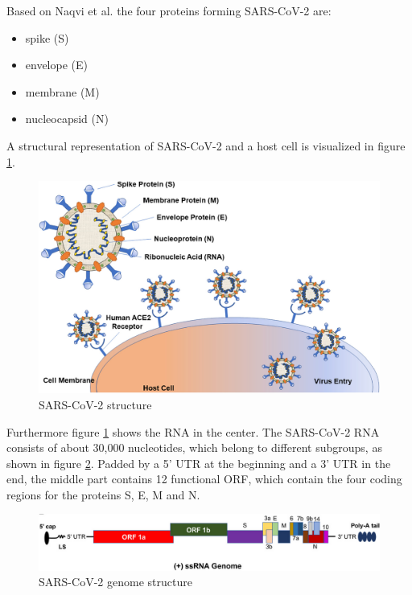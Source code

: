 Based on Naqvi et al. \cite{NAQVI2020165878} the four proteins forming \ac{SARS-CoV-2} are:
\begin{itemize}
	\item spike (S)
	\item envelope (E)
	\item membrane (M)
	\item nucleocapsid (N)
\end{itemize}

A structural representation of \ac{SARS-CoV-2} and a host cell is visualized in figure \ref{sarscov2_structure}. \cite{NAQVI2020165878}

\begin{figure}[ht]
	\centering
	\includegraphics[width=0.8\linewidth]{figures/SARS-CoV-2Structure.jpg}
	\caption{SARS-CoV-2 structure \cite{NAQVI2020165878}}
	\label{sarscov2_structure}
\end{figure}

Furthermore figure \ref{sarscov2_structure} shows the \ac{RNA} in the center. The \ac{SARS-CoV-2} \ac{RNA} consists of about 30,000 nucleotides, which belong to different subgroups, as shown in figure \ref{sarscov2GenomeStructure}. 
Padded by a 5' \ac{UTR} at the beginning and a 3' \ac{UTR} in the end, the middle part contains 12 functional \ac{ORF}, which contain the four coding regions for the proteins S, E, M and N. 

\begin{figure}[ht]
	\centering
	\includegraphics[width=1.0\linewidth]{figures/sarscov2GenomeStructure.png}
	\caption{\ac{SARS-CoV-2} genome structure \cite{NAQVI2020165878}}
	\label{sarscov2GenomeStructure}
\end{figure}

